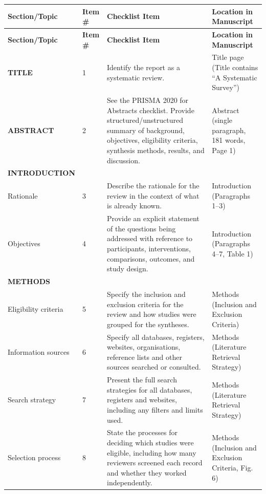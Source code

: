 \documentclass[10pt,a4paper]{article}
\begin{document}
\vspace{1em}
\renewcommand{\arraystretch}{1.25}
\begin{longtable}{p{2.2cm} p{1.2cm} p{8.5cm} p{4.0cm}}
\toprule
\textbf{Section/Topic} & \textbf{Item \#} & \textbf{Checklist Item} & \textbf{Location in Manuscript} \\
\midrule
\endfirsthead
\toprule
\textbf{Section/Topic} & \textbf{Item \#} & \textbf{Checklist Item} & \textbf{Location in Manuscript} \\
\midrule
\endhead
\bottomrule
\endfoot
\bottomrule
\endlastfoot

\textbf{TITLE} & 1 & Identify the report as a systematic review. & Title page (Title contains ``A Systematic Survey'') \\
\midrule
\textbf{ABSTRACT} & 2 & See the PRISMA 2020 for Abstracts checklist. Provide structured/unstructured summary of background, objectives, eligibility criteria, synthesis methods, results, and discussion. & Abstract (single paragraph, 181 words, Page 1) \\
\midrule
\textbf{INTRODUCTION} & & & \\
Rationale & 3 & Describe the rationale for the review in the context of what is already known. & Introduction (Paragraphs 1--3) \\
Objectives & 4 & Provide an explicit statement of the questions being addressed with reference to participants, interventions, comparisons, outcomes, and study design. & Introduction (Paragraphs 4--7, Table 1) \\
\midrule
\textbf{METHODS} & & & \\
Eligibility criteria & 5 & Specify the inclusion and exclusion criteria for the review and how studies were grouped for the syntheses. & Methods (Inclusion and Exclusion Criteria) \\
Information sources & 6 & Specify all databases, registers, websites, organisations, reference lists and other sources searched or consulted. & Methods (Literature Retrieval Strategy) \\
Search strategy & 7 & Present the full search strategies for all databases, registers and websites, including any filters and limits used. & Methods (Literature Retrieval Strategy) \\
Selection process & 8 & State the processes for deciding which studies were eligible, including how many reviewers screened each record and whether they worked independently. & Methods (Inclusion and Exclusion Criteria, Fig. 6) \\

\end{longtable}
\end{document}
